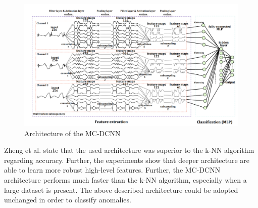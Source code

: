 \begin{figure}[h]
	\centering
	\includegraphics[scale=0.35]{Figures/MC-DCNN}
	\decoRule
	\caption[Architecture of the MC-DCNN]{Architecture of the MC-DCNN \parencite{Zheng2014}}
	\label{fig:MC-DCNN}
\end{figure}

Zheng et al. state that the used architecture was superior to the k-NN algorithm regarding accuracy. Further, the experiments show that deeper architecture are able to learn more robust high-level features. Further, the MC-DCNN architecture performs much faster than the k-NN algorithm, especially when a large dataset is present. The above described architecture could be adopted unchanged in order to classify anomalies.

